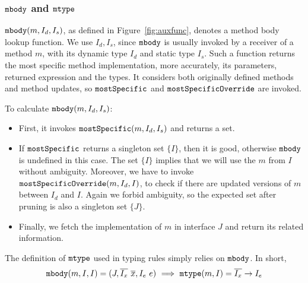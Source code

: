 \subsubsection{$\texttt{mbody}$ and $\texttt{mtype}$}

$\texttt{mbody}(m, I_d, I_s)$, as defined in Figure~\ref{fig:auxfunc}, denotes a method body lookup function.
We use $I_d, I_s$, since $\texttt{mbody}$ is usually invoked by a receiver of a method $m$, with its dynamic
type $I_d$ and static type $I_s$. Such a function returns the most specific method implementation, more
accurately, its parameters, returned expression and the types. It considers both originally defined methods and method updates, so $\texttt{mostSpecific}$ and $\texttt{mostSpecificOverride}$ are invoked.

To calculate $\texttt{mbody}(m, I_d, I_s)$:
\begin{itemize}
	\item First, it invokes $\texttt{mostSpecific}(m, I_d, I_s)$ and returns a set.
	\item If $\texttt{mostSpecific}$ returns a singleton set $\{I\}$, then it is good, otherwise $\texttt{mbody}$ is undefined in
	this case. The set $\{I\}$ implies that we will use the $m$ from $I$ without ambiguity. Moreover, we have to invoke $\texttt{mostSpecificOverride}(m, I_d, I)$, to check if there are updated versions of $m$ between $I_d$ and $I$. Again we forbid ambiguity, so the expected set after pruning is also a singleton set $\{J\}$.
	\item Finally, we fetch the implementation of $m$ in interface $J$ and return its related information.
\end{itemize}
The definition of $\texttt{mtype}$ used in typing rules simply relies on $\texttt{mbody}$. In short,
$$\texttt{mbody}(m, I, I) = (J, \overline{I_x}\ \overline{x}, I_e\ e) \ \Longrightarrow\ \texttt{mtype}(m, I) = \overline{I_x}\rightarrow I_e$$

